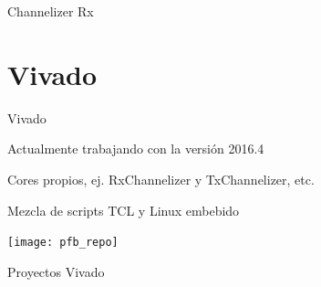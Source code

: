 \documentclass[ignorenonframetext,12pt]{beamer}
\begin{document}
\begin{frame}{Channelizer Rx}
				\begin{center}
				\end{center}
				\begin{center}
				\end{center}
\end{frame}

\section{Vivado}
\begin{frame}{Vivado}

				Actualmente trabajando con la versi\'on 2016.4

				Cores propios, ej. RxChannelizer y TxChannelizer, etc.

				Mezcla de scripts TCL y Linux embebido
				\begin{center}
								\texttt{[image: pfb\_repo]}
				\end{center}
\end{frame}

\begin{frame}{Proyectos Vivado}

				\begin{center}
				\end{center}
				\begin{center}
				\end{center}
\end{frame}
\end{document}
